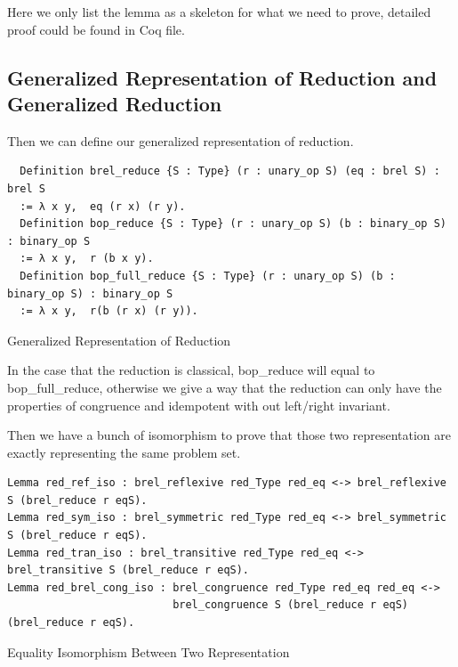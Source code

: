 \documentclass[a4paper,12pt,twoside,openright]{report}
\begin{document}
Here we only list the lemma as a skeleton for what we need to prove, detailed proof could be found in Coq file.

\subsection{Generalized Representation of Reduction and Generalized Reduction}
Then we can define our generalized representation of reduction.
\begin{listing}[H]
\begin{verbatim}
  Definition brel_reduce {S : Type} (r : unary_op S) (eq : brel S) : brel S
  := λ x y,  eq (r x) (r y).   
  Definition bop_reduce {S : Type} (r : unary_op S) (b : binary_op S) : binary_op S
  := λ x y,  r (b x y).
  Definition bop_full_reduce {S : Type} (r : unary_op S) (b : binary_op S) : binary_op S
  := λ x y,  r(b (r x) (r y)).   
\end{verbatim}
\caption{Generalized Representation of Reduction} 
\label{coq:def:generalized_representation}
\end{listing}
In the case that the reduction is classical, bop\_reduce will equal to bop\_full\_reduce, otherwise we give a way that the reduction can only have the properties of congruence and idempotent with out left/right invariant.

Then we have a bunch of isomorphism to prove that those two representation are exactly representing the same problem set.
\begin{listing}[H]
\begin{verbatim}
Lemma red_ref_iso : brel_reflexive red_Type red_eq <-> brel_reflexive S (brel_reduce r eqS).
Lemma red_sym_iso : brel_symmetric red_Type red_eq <-> brel_symmetric S (brel_reduce r eqS).
Lemma red_tran_iso : brel_transitive red_Type red_eq <-> brel_transitive S (brel_reduce r eqS).
Lemma red_brel_cong_iso : brel_congruence red_Type red_eq red_eq <-> 
                          brel_congruence S (brel_reduce r eqS) (brel_reduce r eqS).
\end{verbatim}
\caption{Equality Isomorphism Between Two Representation} 
\label{coq:proof:eq_iso}
\end{listing}
\end{document}
